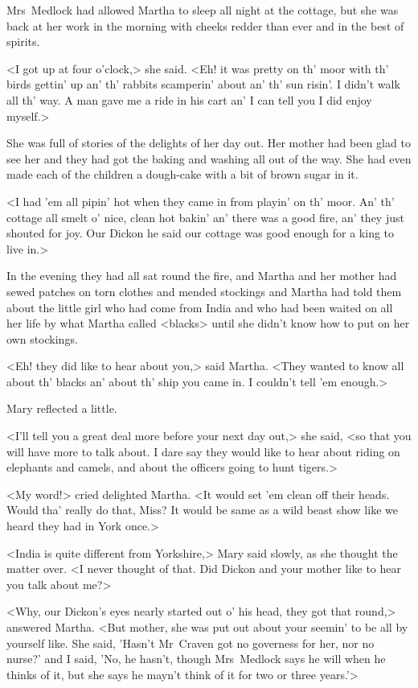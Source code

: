 Mrs~Medlock had allowed Martha to sleep all night at the cottage, but she was back at her work in the morning with cheeks redder than ever and in the best of spirits.

<I got up at four o'clock,> she said. <Eh! it was pretty on th' moor with th' birds gettin' up an' th' rabbits scamperin' about an' th' sun risin'. I didn't walk all th' way. A man gave me a ride in his cart an' I can tell you I did enjoy myself.>

She was full of stories of the delights of her day out. Her mother had been glad to see her and they had got the baking and washing all out of the way. She had even made each of the children a dough-cake with a bit of brown sugar in it.

<I had 'em all pipin' hot when they came in from playin' on th' moor. An' th' cottage all smelt o' nice, clean hot bakin' an' there was a good fire, an' they just shouted for joy. Our Dickon he said our cottage was good enough for a king to live in.>

In the evening they had all sat round the fire, and Martha and her mother had sewed patches on torn clothes and mended stockings and Martha had told them about the little girl who had come from India and who had been waited on all her life by what Martha called <blacks> until she didn't know how to put on her own stockings.

<Eh! they did like to hear about you,> said Martha. <They wanted to know all about th' blacks an' about th' ship you came in. I couldn't tell 'em enough.>

Mary reflected a little.

<I'll tell you a great deal more before your next day out,> she said, <so that you will have more to talk about. I dare say they would like to hear about riding on elephants and camels, and about the officers going to hunt tigers.>

<My word!> cried delighted Martha. <It would set 'em clean off their heads. Would tha' really do that, Miss? It would be same as a wild beast show like we heard they had in York once.>

<India is quite different from Yorkshire,> Mary said slowly, as she thought the matter over. <I never thought of that. Did Dickon and your mother like to hear you talk about me?>

<Why, our Dickon's eyes nearly started out o' his head, they got that round,> answered Martha. <But mother, she was put out about your seemin' to be all by yourself like. She said, 'Hasn't Mr~Craven got no governess for her, nor no nurse?' and I said, 'No, he hasn't, though Mrs~Medlock says he will when he thinks of it, but she says he mayn't think of it for two or three years.'>

